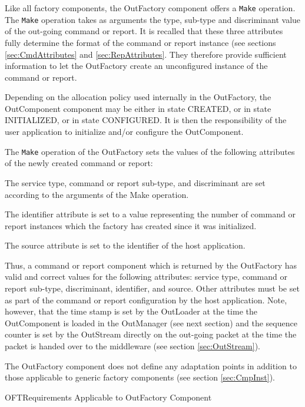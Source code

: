 \documentclass[a4paper,10pt]{article}
\newenvironment{fw_itemize}						%
{\begin{itemize}
  \setlength{\itemsep}{1mm}
  \setlength{\parskip}{0pt}
  \setlength{\parsep}{0pt}}
{\end{itemize}}
\newenvironment{cr_req}[2]
{%
\begin{longtable}{|l|p{9.8cm}|}
\caption{#2} \\
\hline
\rowcolor{light-gray}
\textbf{Req. ID} & \textbf{Requirement Text}\\
\hline\hline
\endfirsthead
\rowcolor{light-gray}
\textbf{Req. ID} & \textbf{Requirement Text}\\
\hline\hline
\endhead
\DTLforeach*[\DTLiseq{\cat}{#1}]{dbReq}{\cat=Category,\type=Type,\id=Id,\reqText=Text}
{\DTLiffirstrow{}{\\\hline}\cat-\id/\type & \textit{\reqText}}\\\hline
}
{\end{longtable}}
\begin{document}
Like all factory components, the OutFactory component offers a \texttt{Make} operation. The \texttt{Make} operation takes as arguments the type, sub-type and discriminant value of the out-going command or report. It is recalled that these three attributes fully determine the format of the command or report instance (see sections \ref{sec:CmdAttributes} and \ref{sec:RepAttributes}. They therefore provide sufficient information to let the OutFactory create an unconfigured instance of the command or report.

Depending on the allocation policy used internally in the OutFactory, the OutComponent component may be either in state CREATED, or in state INITIALIZED, or in state CONFIGURED. It is then the responsibility of the user application to initialize and/or configure the OutComponent.

The \texttt{Make} operation of the OutFactory sets the values of the following attributes of the newly created command or report:
\begin{fw_itemize}
\item The service type, command or report sub-type, and discriminant are set according to the arguments of the Make operation.
\item The identifier attribute is set to a value representing the number of command or report instances which the factory has created since it was initialized.
\item The source attribute is set to the identifier of the host application.
\end{fw_itemize}

Thus, a command or report component which is returned by the OutFactory has valid and correct values for the following attributes: service type, command or report sub-type,  discriminant,  identifier, and source. Other attributes must be set as part of the command or report configuration by the host application. Note, however, that the time stamp is set by the OutLoader at the time the OutComponent is loaded in the OutManager (see next section) and the sequence counter is set by the OutStream directly on the out-going packet at the time the packet is handed over to the middleware (see section \ref{sec:OutStream}).

The OutFactory component does not define any adaptation points in addition to those applicable to generic factory components (see section \ref{sec:CmpInst}). 

\begin{cr_req}{OFT}{Requirements Applicable to OutFactory Component}
\end{cr_req}
\end{document}
